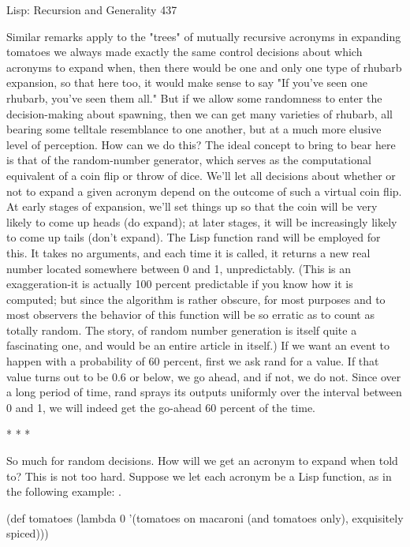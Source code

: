 Lisp: Recursion and Generality                                                    437

        Similar remarks apply to the "trees" of mutually recursive acronyms in
expanding tomatoes we always made exactly the same control decisions about which
acronyms to expand when, then there would be one and only one type of rhubarb
expansion, so that here too, it would make sense to say
        "If you've seen one rhubarb, you've seen them all." But if we allow some
randomness to enter the decision-making about spawning, then we can get many
varieties of rhubarb, all bearing some telltale resemblance to one another, but at a
much more elusive level of perception.
        How can we do this? The ideal concept to bring to bear here is that of the
random-number generator, which serves as the computational equivalent of a coin flip
or throw of dice. We'll let all decisions about whether or not to expand a given
acronym depend on the outcome of such a virtual coin flip. At early stages of
expansion, we'll set things up so that the coin will be very likely to come up heads (do
expand); at later stages, it will be increasingly likely to come up tails (don't expand).
The Lisp function rand will be employed for this. It takes no arguments, and each
time it is called, it returns a new real number located somewhere between 0 and 1,
unpredictably. (This is an exaggeration-it is actually 100 percent predictable if you
know how it is computed; but since the algorithm is rather obscure, for most purposes
and to most observers the behavior of this function will be so erratic as to count as
totally random. The story, of random number generation is itself quite a fascinating
one, and would be an entire article in itself.)
        If we want an event to happen with a probability of 60 percent, first we ask
rand for a value. If that value turns out to be 0.6 or below, we go ahead, and if not,
we do not. Since over a long period of time, rand sprays its outputs uniformly over
the interval between 0 and 1, we will indeed get the go-ahead 60 percent of the time.

                                       *   *   *

        So much for random decisions. How will we get an acronym to expand when
told to? This is not too hard. Suppose we let each acronym be a Lisp function, as in
the following example: .

(def tomatoes (lambda 0
       '(tomatoes on macaroni (and tomatoes only), exquisitely spiced)))

